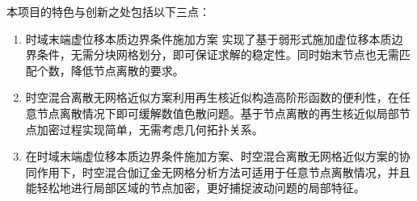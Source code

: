 
本项目的特色与创新之处包括以下三点：

\begin{enumerate}[label=（\theenumi）,left=24pt]
    \item 时域末端虚位移本质边界条件施加方案
    实现了基于弱形式施加虚位移本质边界条件，无需分块网格划分，即可保证求解的稳定性。同时始末节点也无需匹配个数，降低节点离散的要求。
    \item 时空混合离散无网格近似方案利用再生核近似构造高阶形函数的便利性，在任意节点离散情况下即可缓解数值色散问题。基于节点离散的再生核近似局部节点加密过程实现简单，无需考虑几何拓扑关系。
    \item 在时域末端虚位移本质边界条件施加方案、时空混合离散无网格近似方案的协同作用下，时空混合伽辽金无网格分析方法可适用于任意节点离散情况，并且能轻松地进行局部区域的节点加密，更好捕捉波动问题的局部特征。
\end{enumerate}

\vspace{24pt}
